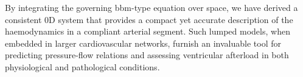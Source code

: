 \documentclass[alpha-refs, 12pt]{wiley-article}
\begin{document}
By integrating the governing \acrshort{bbm}-type equation over space, we have derived a consistent 0D system that provides a compact yet accurate description of the haemodynamics in a compliant arterial segment. Such lumped models, when embedded in larger cardiovascular networks, furnish an invaluable tool for predicting pressure-flow relations and assessing ventricular afterload in both physiological and pathological conditions.
\end{document}
